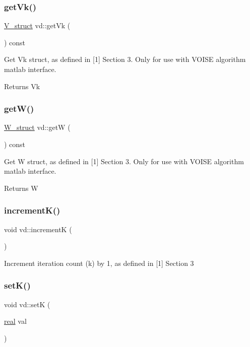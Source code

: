 \subsubsection{\texorpdfstring{get\+Vk()}{getVk()}}
{\footnotesize\ttfamily \mbox{\hyperlink{structV__struct}{V\+\_\+struct}} vd\+::get\+Vk (\begin{DoxyParamCaption}{ }\end{DoxyParamCaption}) const}

Get Vk struct, as defined in \mbox{[}1\mbox{]} Section 3. Only for use with V\+O\+I\+SE algorithm matlab interface. \begin{DoxyReturn}{Returns}
Vk 
\end{DoxyReturn}
\mbox{\label{classvd_ab4d0d9ea76cedf1a6825b62c9ec2d118}} 
\subsubsection{\texorpdfstring{get\+W()}{getW()}}
{\footnotesize\ttfamily \mbox{\hyperlink{structW__struct}{W\+\_\+struct}} vd\+::getW (\begin{DoxyParamCaption}{ }\end{DoxyParamCaption}) const}

Get W struct, as defined in \mbox{[}1\mbox{]} Section 3. Only for use with V\+O\+I\+SE algorithm matlab interface. \begin{DoxyReturn}{Returns}
W 
\end{DoxyReturn}
\mbox{\label{classvd_a59c1f5756af7de9cc7a0089221cbd5b7}} 
\subsubsection{\texorpdfstring{increment\+K()}{incrementK()}}
{\footnotesize\ttfamily void vd\+::incrementK (\begin{DoxyParamCaption}{ }\end{DoxyParamCaption})}

Increment iteration count (k) by 1, as defined in \mbox{[}1\mbox{]} Section 3 \mbox{\label{classvd_a7c692a97b49c4596c4ec1bc0a129b516}} 
\subsubsection{\texorpdfstring{set\+K()}{setK()}}
{\footnotesize\ttfamily void vd\+::setK (\begin{DoxyParamCaption}\item[{\mbox{\hyperlink{typedefs_8cpp_a58a0c7cf2501f4492da833421be92547}{real}}}]{val }\end{DoxyParamCaption})}

